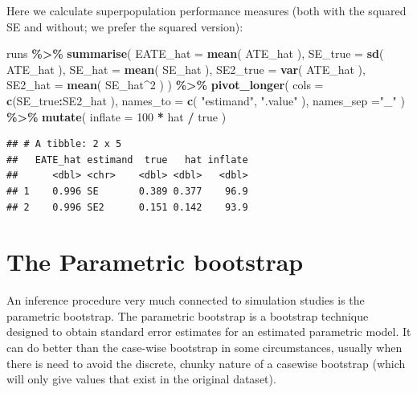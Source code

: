 \documentclass[
]{book}
\newenvironment{Shaded}{\begin{snugshade}}{\end{snugshade}}
\newcommand{\AttributeTok}[1]{\textcolor[rgb]{0.13,0.29,0.53}{#1}}
\newcommand{\DecValTok}[1]{\textcolor[rgb]{0.00,0.00,0.81}{#1}}
\newcommand{\FunctionTok}[1]{\textcolor[rgb]{0.13,0.29,0.53}{\textbf{#1}}}
\newcommand{\NormalTok}[1]{#1}
\newcommand{\SpecialCharTok}[1]{\textcolor[rgb]{0.81,0.36,0.00}{\textbf{#1}}}
\newcommand{\StringTok}[1]{\textcolor[rgb]{0.31,0.60,0.02}{#1}}
\begin{document}
Here we calculate superpopulation performance measures (both with the squared SE and without; we prefer the squared version):

\begin{Shaded}
\begin{Highlighting}[]
\NormalTok{runs }\SpecialCharTok{\%\textgreater{}\%}
  \FunctionTok{summarise}\NormalTok{( }\AttributeTok{EATE\_hat =} \FunctionTok{mean}\NormalTok{( ATE\_hat ),}
             \AttributeTok{SE\_true =} \FunctionTok{sd}\NormalTok{( ATE\_hat ),}
             \AttributeTok{SE\_hat =} \FunctionTok{mean}\NormalTok{( SE\_hat ),}
             \AttributeTok{SE2\_true =} \FunctionTok{var}\NormalTok{( ATE\_hat ),}
             \AttributeTok{SE2\_hat =} \FunctionTok{mean}\NormalTok{( SE\_hat}\SpecialCharTok{\^{}}\DecValTok{2}\NormalTok{ ) ) }\SpecialCharTok{\%\textgreater{}\%}
  \FunctionTok{pivot\_longer}\NormalTok{( }\AttributeTok{cols =} \FunctionTok{c}\NormalTok{(SE\_true}\SpecialCharTok{:}\NormalTok{SE2\_hat ),}
                \AttributeTok{names\_to =} \FunctionTok{c}\NormalTok{( }\StringTok{"estimand"}\NormalTok{, }\StringTok{".value"}\NormalTok{ ),}
                \AttributeTok{names\_sep =}\StringTok{"\_"}\NormalTok{ ) }\SpecialCharTok{\%\textgreater{}\%}
  \FunctionTok{mutate}\NormalTok{( }\AttributeTok{inflate =} \DecValTok{100} \SpecialCharTok{*}\NormalTok{ hat }\SpecialCharTok{/}\NormalTok{ true )}
\end{Highlighting}
\end{Shaded}

\begin{verbatim}
## # A tibble: 2 x 5
##   EATE_hat estimand  true   hat inflate
##      <dbl> <chr>    <dbl> <dbl>   <dbl>
## 1    0.996 SE       0.389 0.377    96.9
## 2    0.996 SE2      0.151 0.142    93.9
\end{verbatim}

\chapter{The Parametric bootstrap}\label{the-parametric-bootstrap}

An inference procedure very much connected to simulation studies is the parametric bootstrap.
The parametric bootstrap is a bootstrap technique designed to obtain standard error estimates for an estimated parametric model.
It can do better than the case-wise bootstrap in some circumstances, usually when there is need to avoid the discrete, chunky nature of a casewise bootstrap (which will only give values that exist in the original dataset).
\end{document}
